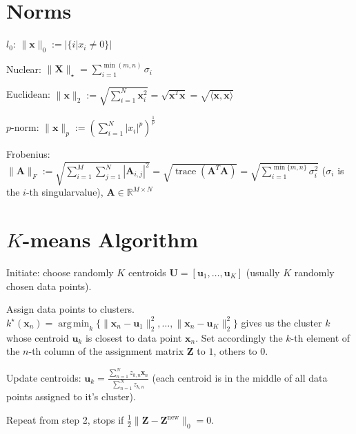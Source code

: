 \documentclass[a4paper, 11pt, landscape]{article}
\DeclareMathOperator*{\argmin}{arg\,min}
\begin{document}
\begin{multicols*}{3}
\section{Norms}
\begin{compactdesc}
	\begin{listcols}
		\item[$l_0$:] $\|\mathbf{x}\|_0 := |\{i | x_i \neq 0\}|$
		\item[Nuclear:] $\|\mathbf{X}\|_\star = \sum_{i=1}^{\min(m, n)} \sigma_i$
	\end{listcols}
	\item[Euclidean:] $\|\mathbf{x}\|_2 := \sqrt{\sum_{i=1}^{N} \mathbf{x}_i^2} = \sqrt{\mathbf{x}^T \mathbf{x}} = \sqrt{\langle \mathbf{x}, \mathbf{x} \rangle}$
	\item[$p$-norm:] $\|\mathbf{x}\|_p := \left( \sum_{i=1}^{N} |x_i|^p \right)^{\frac{1}{p}}$
	\item[Frobenius:] $\|\mathbf{A}\|_F :=\allowbreak \sqrt{\sum_{i=1}^{M} \sum_{j=1}^{N} |\mathbf{A}_{i, j}|^2} =\allowbreak \sqrt{\operatorname{trace}(\mathbf{A}^T \mathbf{A})} =\allowbreak \sqrt{\sum_{i=1}^{\min\{m, n\}} \sigma_i^2}$ ($\sigma_i$ is the $i$-th singularvalue), $\mathbf{A} \in \mathbb{R}^{M \times N}$
\end{compactdesc}

\section{$K$-means Algorithm}
\begin{compactenum}
	\item Initiate: choose randomly $K$ centroids $\mathbf{U} = [\mathbf{u}_1, \ldots, \mathbf{u}_K]$ (usually $K$ randomly chosen data points).
	\item Assign data points to clusters. $k^\star(\mathbf{x}_n) = \argmin_k \{ \|\mathbf{x}_n - \mathbf{u}_1\|_2^2, \ldots, \|\mathbf{x}_n - \mathbf{u}_K\|_2^2 \}$ gives us the cluster $k$ whose centroid $\mathbf{u}_k$ is closest to data point $\mathbf{x}_n$. Set accordingly the $k$-th element of the $n$-th column of the assignment matrix $\mathbf{Z}$ to $1$, others to $0$.
	\item Update centroids: $\mathbf{u}_k = \frac{\sum_{n=1}^N z_{k,n} \mathbf{x}_n}{\sum_{n=1}^N z_{k,n}}$ (each centroid is in the middle of all data points assigned to it's cluster).
	\item Repeat from step 2, stops if $\frac{1}{2} \|\mathbf{Z} - \mathbf{Z}^\text{new}\|_0 = 0$.
\end{compactenum}


\end{multicols*}
\end{document}
